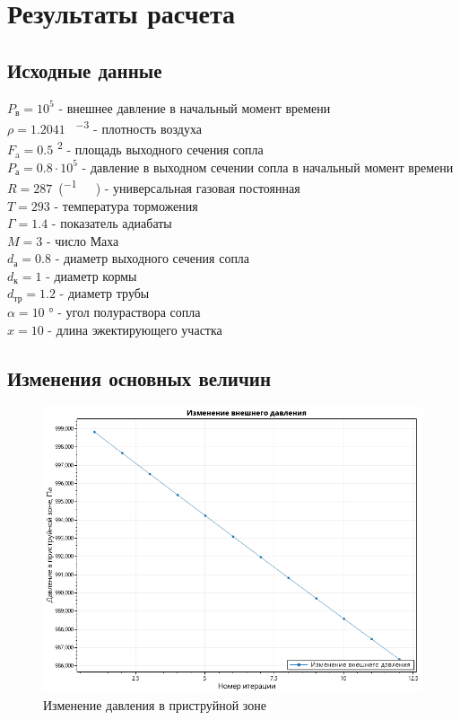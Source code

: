 \chapter{Результаты расчета}
\label{Chapter3}
\setlength{\parindent}{0pt}

\section{Исходные данные}
$P_\text{в}=10^5$ \si{} - внешнее давление в начальный момент времени \\
$\rho=1.2041$ \si{\per{}\cubed} - плотность воздуха \\
$F_\text{a}=0.5$ \si{\squared} - площадь выходного сечения сопла \\
$P_\text{а}=0.8\cdot 10^5$ \si{} - давление в выходном сечении сопла в начальный момент времени \\
$R=287$\si[per-mode = fraction]{\per(.)} - универсальная газовая постоянная \\
$T=293$ \si{} - температура торможения \\
$\varGamma=1.4$ - показатель адиабаты \\
$M=3$ - число Маха \\
$d_\text{а}=0.8$ \si{} - диаметр выходного сечения сопла \\
$d_\text{к}=1$ \si{} - диаметр кормы \\
$d_\text{тр}=1.2$ \si{} - диаметр трубы \\
$\alpha=10$ \si{\degree} - угол полураствора сопла \\
$x=10$ \si{} - длина эжектирующего участка \\

\section{Изменения основных величин}

\begin{figure}[H]
    \label{fig:ExternalPressure}
    \centering
    \includegraphics[width=13cm]{Figures/Pext.png}
    \caption{Изменение давления в приструйной зоне}
\end{figure}

